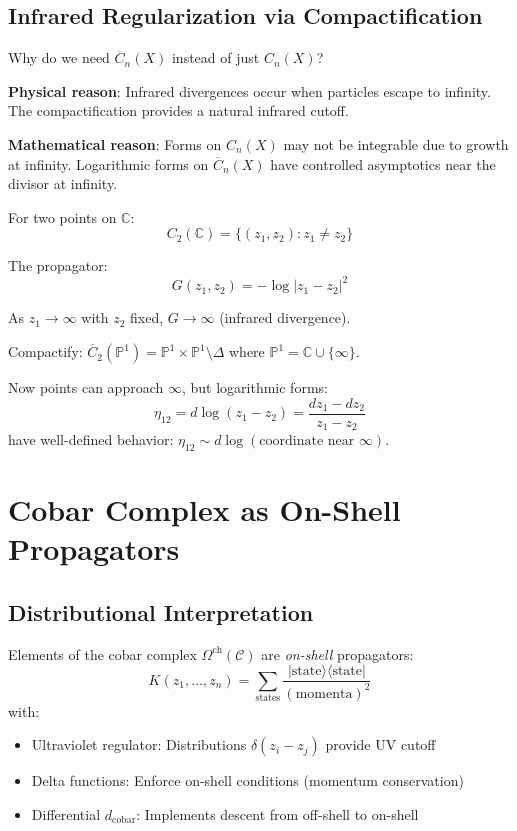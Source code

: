 \subsection{Infrared Regularization via Compactification}

\begin{remark}
Why do we need $\overline{C}_n(X)$ instead of just $C_n(X)$?

\textbf{Physical reason}: Infrared divergences occur when particles escape to 
infinity. The compactification provides a natural infrared cutoff.

\textbf{Mathematical reason}: Forms on $C_n(X)$ may not be integrable due to 
growth at infinity. Logarithmic forms on $\overline{C}_n(X)$ have controlled 
asymptotics near the divisor at infinity.
\end{remark}

\begin{example}
For two points on $\mathbb{C}$:
$$C_2(\mathbb{C}) = \{(z_1,z_2) : z_1 \neq z_2\}$$

The propagator:
$$G(z_1,z_2) = -\log|z_1-z_2|^2$$

As $z_1 \to \infty$ with $z_2$ fixed, $G \to \infty$ (infrared divergence).

Compactify: $\overline{C}_2(\mathbb{P}^1) = \mathbb{P}^1 \times \mathbb{P}^1 
\setminus \Delta$ where $\mathbb{P}^1 = \mathbb{C} \cup \{\infty\}$.

Now points can approach $\infty$, but logarithmic forms:
$$\eta_{12} = d\log(z_1-z_2) = \frac{dz_1-dz_2}{z_1-z_2}$$
have well-defined behavior: $\eta_{12} \sim d\log(\text{coordinate near } \infty)$.
\end{example}

\section{Cobar Complex as On-Shell Propagators}

\subsection{Distributional Interpretation}

\begin{theorem}[Cobar = On-Shell Propagators]
Elements of the cobar complex $\Omega^{\text{ch}}(\mathcal{C})$ are \emph{on-shell} 
propagators:
$$K(z_1,\ldots,z_n) = \sum_{\text{states}} \frac{|\text{state}\rangle 
\langle\text{state}|}{(\text{momenta})^2}$$
with:
\begin{itemize}
\item Ultraviolet regulator: Distributions $\delta(z_i-z_j)$ provide UV cutoff
\item Delta functions: Enforce on-shell conditions (momentum conservation)
\item Differential $d_{\text{cobar}}$: Implements descent from off-shell to on-shell
\end{itemize}
\end{theorem}

